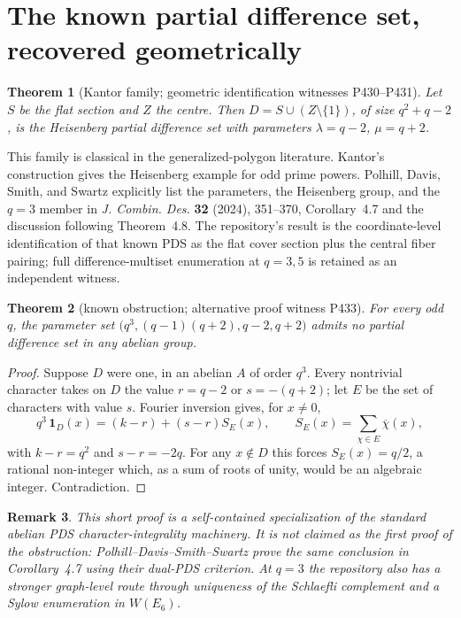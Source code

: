 \documentclass[11pt]{article}
\newtheorem{theorem}{Theorem}
\newtheorem{remark}[theorem]{Remark}
\begin{document}
\section{The known partial difference set, recovered geometrically}

\begin{theorem}[Kantor family; geometric identification witnesses P430--P431]
Let $S$ be the flat section and $Z$ the centre. Then
$D=S\cup(Z\setminus\{1\})$, of size $q^2+q-2$, is the Heisenberg partial
difference set with parameters $\lambda=q-2$, $\mu=q+2$.
\end{theorem}

This family is classical in the generalized-polygon literature. Kantor's
construction gives the Heisenberg example for odd prime powers. Polhill,
Davis, Smith, and Swartz explicitly list the parameters, the Heisenberg group,
and the $q=3$ member in \emph{J. Combin. Des.} \textbf{32} (2024), 351--370,
Corollary~4.7 and the discussion following Theorem~4.8. The repository's result
is the coordinate-level identification of that known PDS as the flat cover
section plus the central fiber pairing; full difference-multiset enumeration
at $q=3,5$ is retained as an independent witness.

\begin{theorem}[known obstruction; alternative proof witness P433]
For every odd $q$, the parameter set
$\bigl(q^3,(q-1)(q+2),q-2,q+2\bigr)$ admits no partial difference set in any
abelian group.
\end{theorem}

\begin{proof}
Suppose $D$ were one, in an abelian $A$ of order $q^3$. Every nontrivial
character takes on $D$ the value $r=q-2$ or $s=-(q+2)$; let $E$ be the set of
characters with value $s$. Fourier inversion gives, for $x\neq0$,
\[
q^3\,\mathbf 1_D(x)=(k-r)+(s-r)S_E(x),
\qquad S_E(x)=\sum_{\chi\in E}\overline\chi(x),
\]
with $k-r=q^2$ and $s-r=-2q$. For any $x\notin D$ this forces
$S_E(x)=q/2$, a rational non-integer which, as a sum of roots of unity, would
be an algebraic integer. Contradiction.
\end{proof}

\begin{remark}
This short proof is a self-contained specialization of the standard abelian
PDS character-integrality machinery. It is not claimed as the first proof of
the obstruction: Polhill--Davis--Smith--Swartz prove the same conclusion in
Corollary~4.7 using their dual-PDS criterion. At $q=3$ the repository also has
a stronger graph-level route through uniqueness of the Schlaefli complement
and a Sylow enumeration in $W(E_6)$.
\end{remark}
\end{document}
